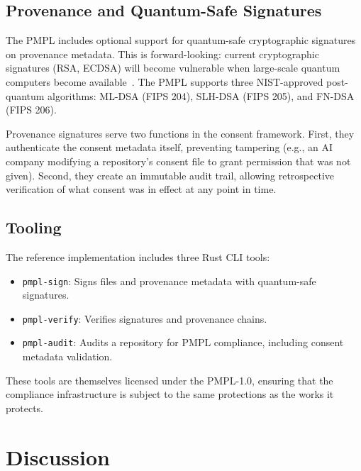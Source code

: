 \documentclass[11pt,twocolumn]{article}
\begin{document}
\subsection{Provenance and Quantum-Safe Signatures}

The PMPL includes optional support for quantum-safe cryptographic
signatures on provenance metadata. This is forward-looking: current
cryptographic signatures (RSA, ECDSA) will become vulnerable when
large-scale quantum computers become available~\cite{nist-pqc}. The
PMPL supports three NIST-approved post-quantum algorithms: ML-DSA
(FIPS 204), SLH-DSA (FIPS 205), and FN-DSA (FIPS 206).

Provenance signatures serve two functions in the consent framework.
First, they authenticate the consent metadata itself, preventing
tampering (e.g., an AI company modifying a repository's consent file
to grant permission that was not given). Second, they create an
immutable audit trail, allowing retrospective verification of what
consent was in effect at any point in time.

\subsection{Tooling}

The reference implementation includes three Rust CLI tools:

\begin{itemize}
    \item \texttt{pmpl-sign}: Signs files and provenance metadata with
          quantum-safe signatures.
    \item \texttt{pmpl-verify}: Verifies signatures and provenance
          chains.
    \item \texttt{pmpl-audit}: Audits a repository for PMPL compliance,
          including consent metadata validation.
\end{itemize}

These tools are themselves licensed under the PMPL-1.0, ensuring that
the compliance infrastructure is subject to the same protections as the
works it protects.

\section{Discussion}
\label{sec:discussion}
\end{document}
